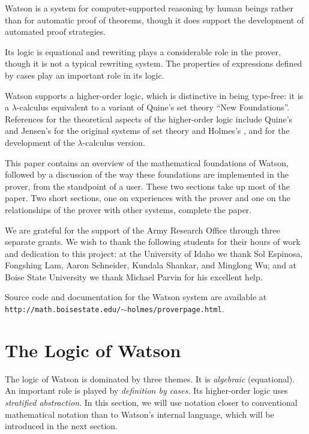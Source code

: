 \documentclass{kluwer}
\begin{document}
\begin{article}
Watson is a system for computer-supported reasoning by human beings
rather than for automatic proof of theorems, though it does support
the development of automated proof strategies.  

Its logic is equational and rewriting plays a considerable role in the
prover, though it is not a typical rewriting system.  The properties
of expressions defined by cases play an important role in its logic.

Watson supports a higher-order logic, which is distinctive in being
type-free: it is a $\lambda$-calculus equivalent to a variant of
Quine's set theory ``New Foundations''.  References for the
theoretical aspects of the higher-order logic include Quine's
\cite{nf} and Jensen's \cite{nfu} for the original systems of set
theory and Holmes's \cite{trc}, \cite{stratified} and \cite{textbook}
for the development of the $\lambda$-calculus version.

This paper contains an overview of the mathematical foundations of
Watson, followed by a discussion of the way these foundations are
implemented in the prover, from the standpoint of a user.  These two
sections take up most of the paper.  Two short sections, one on
experiences with the prover and one on the relationships of the prover
with other systems, complete the paper.

We are grateful for the support of the Army Research Office through
three separate grants. We wish to thank the
following students for their hours of work and dedication to this
project: at the University of Idaho we thank Sol Espinosa, Fongshing
Lam, Aaron Schneider, Kundala Shankar, and Minglong Wu; and at Boise
State University we thank Michael Parvin for his excellent help.

Source code and documentation for the Watson system are available at
{\tt http://math.boisestate.edu/$\sim$holmes/proverpage.html}.

\section{The Logic of Watson}

The logic of Watson is dominated by three themes.  It is {\em
algebraic\/} (equational).  An important role is played by {\em
definition by cases\/}.  Its higher-order logic uses {\em stratified
abstraction\/}.  In this section, we will use notation closer to
conventional mathematical notation than to Watson's internal language,
which will be introduced in the next section.


\end{article}
\end{document}
